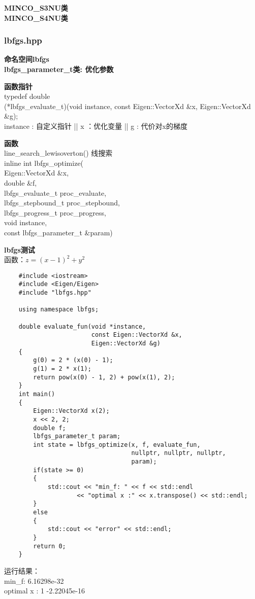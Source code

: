     \textbf{MINCO\_S3NU类}\\
    \textbf{MINCO\_S4NU类}
\subsubsection{lbfgs.hpp}
\textbf{命名空间lbfgs}\\
\textbf{lbfgs\_parameter\_t类: 优化参数}\\
\begin{tcolorbox}[red]
    \textbf{函数指针}\\
    typedef double \\(*lbfgs\_evaluate\_t)(void \*instance, const Eigen::VectorXd \&x, Eigen::VectorXd \&g);\\
    instance : 自定义指针 ||  x ：优化变量  || g : 代价对x的梯度
\end{tcolorbox}
\begin{tcolorbox}[red]
    \textbf{函数}\\
    line\_search\_lewisoverton()    线搜索\\
    inline int lbfgs\_optimize(\\
        Eigen::VectorXd \&x,\\
                              double \&f,\\
                              lbfgs\_evaluate\_t proc\_evaluate,\\
                              lbfgs\_stepbound\_t proc\_stepbound,\\
                              lbfgs\_progress\_t proc\_progress,\\
                              void \*instance,\\
                              const lbfgs\_parameter\_t \&param)\\
\end{tcolorbox}


\textbf{lbfgs测试}\\
函数：$ z = (x-1)^2 + y^2$\\
\begin{lstlisting}
    #include <iostream>
    #include <Eigen/Eigen>
    #include "lbfgs.hpp"
    
    using namespace lbfgs;
    
    double evaluate_fun(void *instance, 
                        const Eigen::VectorXd &x, 
                        Eigen::VectorXd &g)
    {
        g(0) = 2 * (x(0) - 1);
        g(1) = 2 * x(1);
        return pow(x(0) - 1, 2) + pow(x(1), 2);
    }  
    int main()
    {
        Eigen::VectorXd x(2);
        x << 2, 2;
        double f;
        lbfgs_parameter_t param;
        int state = lbfgs_optimize(x, f, evaluate_fun, 
                                   nullptr, nullptr, nullptr, 
                                   param);
        if(state >= 0)
        {
            std::cout << "min_f: " << f << std::endl 
                    << "optimal x :" << x.transpose() << std::endl;
        }
        else
        {
            std::cout << "error" << std::endl;
        }
        return 0;
    }
\end{lstlisting}
运行结果：\\
min\_f: 6.16298e-32\\
optimal x :           1 -2.22045e-16\\
